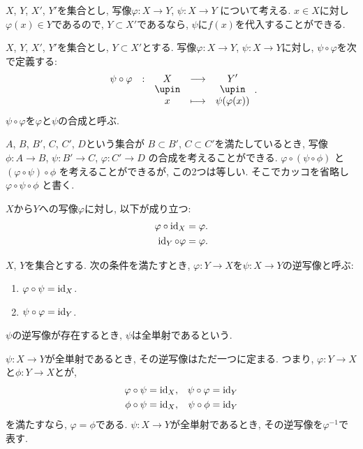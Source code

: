 $X$, $Y$, $X'$, $Y'$を集合とし,
写像$\varphi\colon X\to Y$, $\psi\colon X\to Y$
について考える.
$x\in X$に対し$\varphi(x)\in Y$であるので,
$Y\subset X'$であるなら,
$\psi$に$f(x)$を代入することができる.
\begin{definition}
$X$, $Y$, $X'$, $Y'$を集合とし,
$Y\subset X'$とする.
写像$\varphi\colon X\to Y$, $\psi\colon X\to Y$に対し,
$\psi\circ\varphi$を次で定義する:
\begin{align*}
\shazo{\psi\circ\varphi}{X}{Y'}
{x}{\psi(\varphi(x))}.
\end{align*}
$\psi\circ\varphi$を$\varphi$と$\psi$の合成と呼ぶ.
\end{definition}
$A$, $B$, $B'$, $C$, $C'$, $D$という集合が
$B\subset B'$, $C\subset C'$を満たしているとき,
写像
$\phi\colon A\to B$,
$\psi\colon B'\to C$,
$\varphi\colon C'\to D$
の合成を考えることができる.
$\varphi\circ (\psi\circ \phi)$
と
$(\varphi\circ \psi)\circ \phi$
を考えることができるが, この2つは等しい.
そこでカッコを省略し
$\varphi \circ \psi \circ \phi$
と書く.
\begin{prop}
$X$から$Y$への写像$\varphi$に対し,
以下が成り立つ:
\begin{align*}
\varphi\circ\operatorname{id}_X&=\varphi.\\
\operatorname{id}_Y\circ\varphi&=\varphi.
\end{align*}
\end{prop}

\begin{definition}
$X$, $Y$を集合とする.
次の条件を満たすとき,
$\varphi\colon Y\to X$を$\psi\colon X\to Y$の逆写像と呼ぶ:
\begin{enumerate}
\item $\varphi\circ\psi =\operatorname{id}_X$.
\item $\psi\circ \varphi =\operatorname{id}_Y$.
\end{enumerate}
$\psi$の逆写像が存在するとき,
$\psi$は全単射であるという.
\end{definition}
$\psi\colon X\to Y$が全単射であるとき, その逆写像はただ一つに定まる.
つまり, $\varphi\colon Y\to X$と$\phi\colon Y\to X$とが,
\begin{align*}
\varphi\circ\psi &=\operatorname{id}_X, &
\psi\circ \varphi &=\operatorname{id}_Y \\
\phi\circ\psi &=\operatorname{id}_X, &
\psi\circ \phi &=\operatorname{id}_Y 
\end{align*}
を満たすなら,
$\varphi=\phi$である.
$\psi\colon X\to Y$が全単射であるとき, その逆写像を$\varphi^{-1}$で表す.
 


